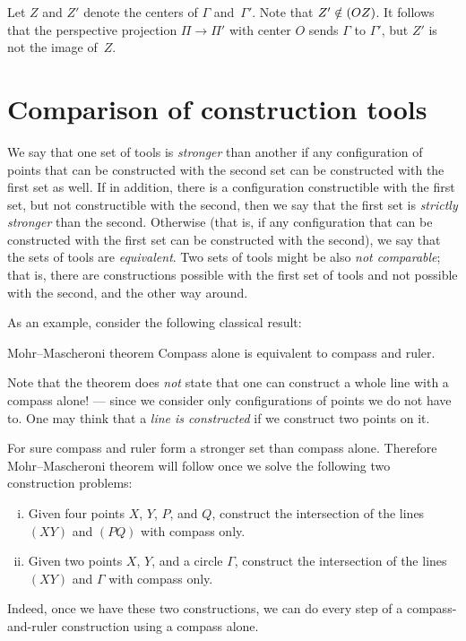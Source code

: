 Let $Z$ and $Z'$ denote the centers of $\Gamma$ and~$\Gamma'$.
Note that  $Z'\z\notin(OZ)$.
It follows that the perspective projection $\Pi\to \Pi'$ with center $O$ sends $\Gamma$ to $\Gamma'$, but $Z'$ is not the image of~$Z$.
\qeds

\section{Comparison of construction tools}

We say that one set of tools is \emph{stronger} than another if any configuration of points that can be constructed with the second set can be constructed with the first set as well.
If in addition, there is a configuration constructible with the first set, but not constructible with the second, then we say that the first set is {}\emph{strictly stronger} than the second.
Otherwise (that is, if any configuration that can be constructed with the first set can be constructed with the second), we say that the sets of tools are \emph{equivalent}. 
Two sets of tools might be also \emph{not comparable};
that is, there are constructions possible with the first set of tools and not possible with the second, and the other way around.

As an example, consider the following classical result:

\begin{thm}{Mohr--Mascheroni theorem}
Compass alone is equivalent to compass and ruler.
\end{thm}

Note that the theorem does \emph{not} state that one can construct a whole line with a compass alone!
--- since we consider only configurations of points we do not have to.
One may think that a \emph{line is constructed} if we construct two points on it.

For sure compass and ruler form a stronger set than compass alone.
Therefore Mohr--Mascheroni theorem will follow once we solve the following two construction problems:
\begin{enumerate}[(i)]
\item Given four points $X$, $Y$, $P$, and $Q$, construct the intersection of the lines $(XY)$ and $(PQ)$ with compass only.
\item Given two points $X$, $Y$, and a circle $\Gamma$, construct the intersection of the lines $(XY)$ and $\Gamma$ with compass only.
\end{enumerate}
Indeed, once we have these two constructions, we can do every step of a compass-and-ruler construction using a compass alone.

